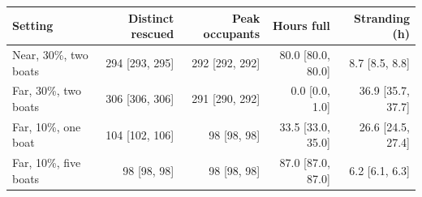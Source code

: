 \begin{tabular}{lrrrr}
\toprule
Setting & Distinct rescued & Peak occupants & Hours full & Stranding (h) \\
\midrule
Near, 30\%, two boats & 294 [293, 295] & 292 [292, 292] & 80.0 [80.0, 80.0] & 8.7 [8.5, 8.8] \\
Far, 30\%, two boats & 306 [306, 306] & 291 [290, 292] & 0.0 [0.0, 1.0] & 36.9 [35.7, 37.7] \\
Far, 10\%, one boat & 104 [102, 106] & 98 [98, 98] & 33.5 [33.0, 35.0] & 26.6 [24.5, 27.4] \\
Far, 10\%, five boats & 98 [98, 98] & 98 [98, 98] & 87.0 [87.0, 87.0] & 6.2 [6.1, 6.3] \\
\bottomrule
\end{tabular}
